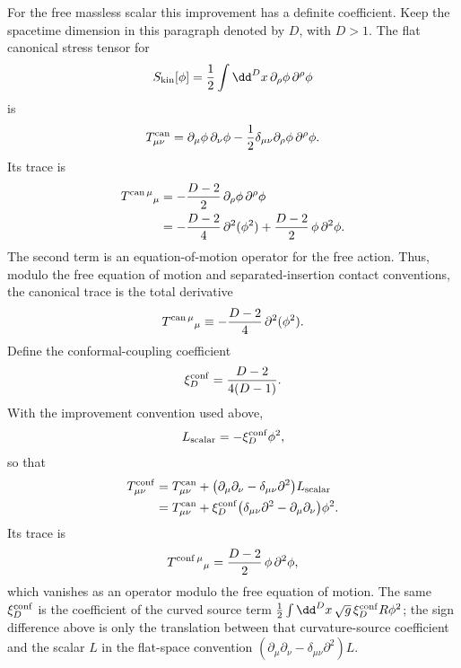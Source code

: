 For the free massless scalar this improvement has a definite coefficient.
Keep the spacetime dimension in this paragraph denoted by \(D\), with
\(D>1\).  The flat canonical stress tensor for
\[
  S_{\rm kin}[\phi]
  =
  \frac12\int\dd^D x\,\partial_\rho\phi\,\partial^\rho\phi
\]
is
\[
  T^{\rm can}_{\mu\nu}
  =
  \partial_\mu\phi\,\partial_\nu\phi
  -
  \frac12\delta_{\mu\nu}\partial_\rho\phi\,\partial^\rho\phi .
\]
Its trace is
\[
\begin{aligned}
  T^{{\rm can}\,\mu}{}_\mu
  &=
  -\frac{D-2}{2}\,\partial_\rho\phi\,\partial^\rho\phi                         \\
  &=
  -\frac{D-2}{4}\,\partial^2(\phi^2)
  +
  \frac{D-2}{2}\,\phi\,\partial^2\phi .
\end{aligned}
\]
The second term is an equation-of-motion operator for the free action.  Thus,
modulo the free equation of motion and separated-insertion contact
conventions, the canonical trace is the total derivative
\[
  T^{{\rm can}\,\mu}{}_\mu
  \equiv
  -\frac{D-2}{4}\,\partial^2(\phi^2).
\]
Define the conformal-coupling coefficient
\[
  \xi_D^{\rm conf}
  =
  \frac{D-2}{4(D-1)}.
\]
With the improvement convention used above,
\[
  L_{\rm scalar}=-\xi_D^{\rm conf}\phi^2,
\]
so that
\[
\begin{aligned}
  T^{\rm conf}_{\mu\nu}
  &=
  T^{\rm can}_{\mu\nu}
  +
  \bigl(\partial_\mu\partial_\nu-\delta_{\mu\nu}\partial^2\bigr)L_{\rm scalar}
  \\
  &=
  T^{\rm can}_{\mu\nu}
  +
  \xi_D^{\rm conf}
  \bigl(\delta_{\mu\nu}\partial^2-\partial_\mu\partial_\nu\bigr)\phi^2 .
\end{aligned}
\]
Its trace is
\[
  T^{{\rm conf}\,\mu}{}_\mu
  =
  \frac{D-2}{2}\,\phi\,\partial^2\phi,
\]
which vanishes as an operator modulo the free equation of motion.  The same
\(\xi_D^{\rm conf}\) is the coefficient of the curved source term
\(\frac12\int\dd^D x\,\sqrt g\,\xi_D^{\rm conf}R\phi^2\); the sign difference
above is only the translation between that curvature-source coefficient and
the scalar \(L\) in the flat-space convention
\((\partial_\mu\partial_\nu-\delta_{\mu\nu}\partial^2)L\).

